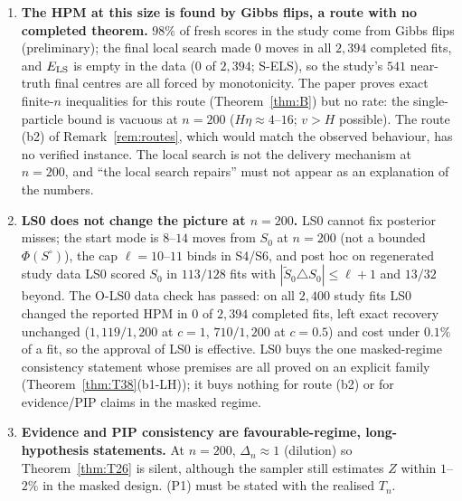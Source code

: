 \documentclass[11pt]{article}
\theoremstyle{definition}
\theoremstyle{remark}
\newcommand{\Sz}{S_0}
\begin{document}
\begin{enumerate}
\item[5.] \textbf{The HPM at this size is found by Gibbs flips, a route with no completed theorem.}
$98\%$ of fresh scores in the study come from Gibbs flips (preliminary); the final local search made $0$ moves in all $2{,}394$ completed fits, and $E_{\rm LS}$ is empty in the data ($0$ of $2{,}394$; S-ELS), so the study's $541$ near-truth final centres are all forced by monotonicity. The paper proves exact finite-$n$ inequalities for this route (Theorem~\ref{thm:B}) but no rate: the single-particle bound is vacuous at $n=200$ ($H\eta\approx4$--$16$; $v>H$ possible). The route (b2) of Remark~\ref{rem:routes}, which would match the observed behaviour, has no verified instance. The local search is not the delivery mechanism at $n=200$, and ``the local search repairs'' must not appear as an explanation of the numbers.

\item[6.] \textbf{LS0 does not change the picture at $n=200$.}
LS0 cannot fix posterior misses; the start mode is $8$--$14$ moves from $\Sz$ at $n=200$ (not a bounded $\Phi(S^\circ)$), the cap $\ell=10$--$11$ binds in S4/S6, and post hoc on regenerated study data LS0 scored $\Sz$ in $113/128$ fits with $|\tilde S_0\triangle\Sz|\le\ell+1$ and $13/32$ beyond. The O-LS0 data check has passed: on all $2{,}400$ study fits LS0 changed the reported HPM in $0$ of $2{,}394$ completed fits, left exact recovery unchanged ($1{,}119/1{,}200$ at $c=1$, $710/1{,}200$ at $c=0.5$) and cost under $0.1\%$ of a fit, so the approval of LS0 is effective. LS0 buys the one masked-regime consistency statement whose premises are all proved on an explicit family (Theorem~\ref{thm:T38}(b1-LH)); it buys nothing for route (b2) or for evidence/PIP claims in the masked regime.

\item[7.] \textbf{Evidence and PIP consistency are favourable-regime, long-hypothesis statements.}
At $n=200$, $\Delta_n\approx1$ (dilution) so Theorem~\ref{thm:T26} is silent, although the sampler still estimates $Z$ within $1$--$2\%$ in the masked design. (P1) must be stated with the realised $T_n$.


\end{enumerate}
\end{document}
